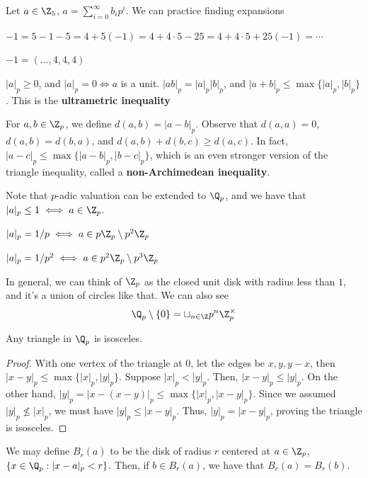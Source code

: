 \begin{ex}
    Let $a \in \Z_5$, $a=\sum_{i=0}^\infty b_ip^i$. We can practice finding expansions

    $-1=5-1-5=4+5(-1)=4+4\cdot 5-25=4+4\cdot5 +25(-1)=\cdots$

    $-1=(\dots,4,4,4)$
\end{ex}

\begin{prop}
    $|a|_p\geq0$, and $|a|_p=0\iff a$ is a unit. $|ab|_p=|a|_p|b|_p$, and $|a+b|_p \leq \max\{|a|_p,|b|_p\}$. This is the \textbf{ultrametric inequality}
\end{prop}

\begin{defn}[Distance on $\Z_p$]
    For $a,b \in \Z_p$, we define $d(a,b)=|a-b|_p$. Observe that $d(a,a)=0$, $d(a,b)=d(b,a)$, and $d(a,b)+d(b,c) \geq d(a,c)$. In fact, $|a-c|_p \leq \max\{|a-b|_p,|b-c|_p\}$, which is an even stronger version of the triangle inequality, called a \textbf{non-Archimedean inequality}.
\end{defn}

Note that $p$-adic valuation can be extended to $\Q_p$, and we have that $|a|_p \leq 1 \iff a \in \Z_p$.

\begin{ex}
    $|a|_p = 1/p \iff a \in p\Z_p\setminus p^2\Z_p$

    $|a|_p=1/p^2 \iff a \in p^2\Z_p \setminus p^3\Z_p$

    In general, we can think of $\Z_p$ as the closed unit disk with radius less than $1$, and it's a union of circles like that. We can also see
    $$\Q_p \setminus \{ 0\} =\sqcup_{n\in \Z}p^n\Z_p^\times$$
\end{ex}

\begin{prop}
    Any triangle in $\Q_p$ is isosceles.
\end{prop}

\begin{proof}
    With one vertex of the triangle at $0$, let the edges be $x,y,y-x$, then $|x-y|_p \leq \max\{|x|_p,|y|_p\}$. Suppose $|x|_p <|y|_p$. Then, $|x-y|_p\leq |y|_p$. On the other hand, $|y|_p=|x-(x-y)|_p\leq \max\{|x|_p,|x-y|_p\}$. Since we assumed $|y|_p \not \leq |x|_p$, we must have $|y|_p \leq |x-y|_p$. Thus, $|y|_p=|x-y|_p$, proving the triangle is isosceles.
\end{proof}

\begin{prop}
    We may define $B_r(a)$ to be the disk of radius $r$ centered at $a\in \Z_p$, $\{x \in \Q_p : |x-a|_p < r\}$. Then, if $b \in B_r(a)$, we have that $B_r(a)=B_r(b)$.
\end{prop}

